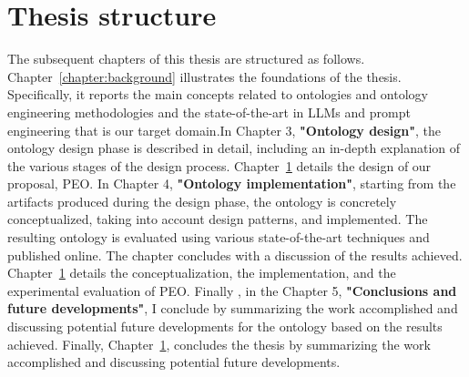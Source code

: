 \section{Thesis structure}
The subsequent chapters of this thesis are structured as follows. 
Chapter~\ref{chapter:background} illustrates the foundations of the thesis.
Specifically, it reports the main concepts related to ontologies and ontology engineering methodologies and the state-of-the-art in LLMs and prompt engineering that is our target domain.In Chapter 3, \textbf{"Ontology design"}, the ontology design phase is described in detail, including an in-depth explanation of the various stages of the design process. 
Chapter~\ref{} details the design of our proposal, PEO. 
In Chapter 4, \textbf{"Ontology implementation"}, starting from the artifacts produced during the design phase, the ontology is concretely conceptualized, taking into account design patterns, and implemented. The resulting ontology is evaluated using various state-of-the-art techniques and published online. The chapter concludes with a discussion of the results achieved.
Chapter~\ref{} details the conceptualization, the implementation, and the experimental evaluation of PEO. 
Finally , in the Chapter 5, \textbf{"Conclusions and future developments"}, I conclude by summarizing the work accomplished and discussing potential future developments for the ontology based on the results achieved.
Finally, Chapter~\ref{}, concludes the thesis by summarizing the work accomplished and discussing potential future developments.
